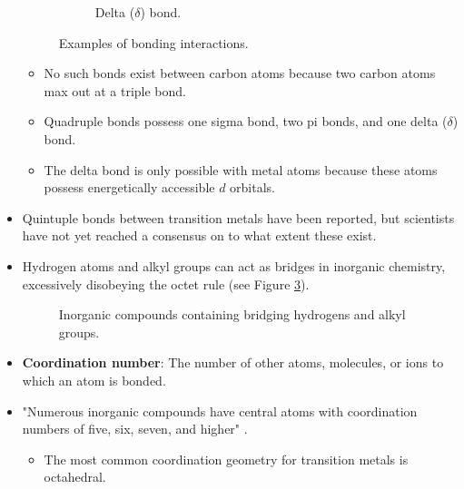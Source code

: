 \documentclass[../notes.tex]{subfiles}
\begin{document}
\begin{itemize}
\begin{figure}[h!]
\begin{subfigure}[b]{0.3\linewidth}
            \caption{Delta ($\delta$) bond.}
            \label{fig:sigmaPiDeltac}
        \end{subfigure}
        \caption{Examples of bonding interactions.}
        \label{fig:sigmaPiDelta}
    \end{figure}
    \begin{itemize}
        \item No such bonds exist between carbon atoms because two carbon atoms max out at a triple bond.
        \item Quadruple bonds possess one sigma bond, two pi bonds, and one delta ($\delta$) bond.
        \item The delta bond is only possible with metal atoms because these atoms possess energetically accessible $d$ orbitals.
    \end{itemize}
    \item Quintuple bonds between transition metals have been reported, but scientists have not yet reached a consensus on to what extent these exist.
    \item Hydrogen atoms and alkyl groups can act as bridges in inorganic chemistry, excessively disobeying the octet rule (see Figure \ref{fig:bridgingH-CH3}).
    \begin{figure}[h!]
        \centering
        \footnotesize
        \hspace{5em}
        \caption{Inorganic compounds containing bridging hydrogens and alkyl groups.}
        \label{fig:bridgingH-CH3}
    \end{figure}
    \item \textbf{Coordination number}: The number of other atoms, molecules, or ions to which an atom is bonded.
    \item "Numerous inorganic compounds have central atoms with coordination numbers of five, six, seven, and higher" \parencite[2]{bib:MiesslerFischerTarr}.
    \begin{itemize}
        \item The most common coordination geometry for transition metals is octahedral.

\end{itemize}
\end{itemize}
\end{document}
